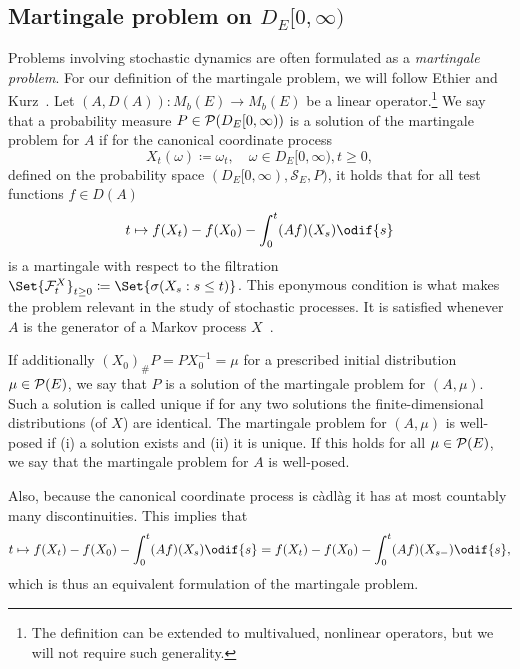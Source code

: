 

\subsection{Martingale problem on \texorpdfstring{\(D_E[0,\infty)\)}{D([0,infinity), E)}}\label{sec:martingale-problem}

Problems involving stochastic dynamics are often formulated as a \textit{martingale problem}.
For our definition of the martingale problem, we will follow Ethier and Kurz~\cite[p.174]{ethierMarkovProcessesCharacterization1985}.
Let \((A, D(A)) : M_b(E) \to M_b(E)\) be a linear operator.\footnote{The definition can be extended to multivalued, nonlinear operators, but we will not require such generality.}
We say that a probability measure \(P \in \mathcal{P}(D_E[0,\infty))\) is a solution of the martingale problem for \(A\) if for the canonical coordinate process
\begin{equation}
  X_t(\omega) \coloneqq \omega_t, \quad \omega \in D_E[0,\infty), t \geq 0,
\end{equation}
defined on the probability space \((D_E[0,\infty), \mathscr{S}_E, P)\), it holds that for all test functions \(f \in D(A)\)
\begin{equation}\label{eq:mart-problem}
  t \mapsto f(X_t) - f(X_0) - \int_0^t (Af)(X_s) \odif{s}
\end{equation}
is a martingale with respect to the filtration \(\Set{\cF_t^X}_{t\geq0} \coloneqq \Set{\sigma(X_s : s \leq t)}\). %
This eponymous condition is what makes the problem relevant in the study of stochastic processes.
It is satisfied whenever \(A\) is the generator of a Markov process \(X\)~\cite[161-162]{ethierMarkovProcessesCharacterization1985}.

If additionally \( (X_0)_\# P = P X_0^{-1} = \mu \) for a prescribed initial distribution \(\mu \in \mathcal{P}(E)\), we say that \(P\) is a solution of the martingale problem for \((A,\mu)\).
Such a solution is called unique if for any two solutions the finite-dimensional distributions (of \(X\)) are identical.
The martingale problem for \((A,\mu)\) is well-posed if (i) a solution exists and (ii) it is unique.
If this holds for all \(\mu \in \mathcal{P}(E)\), we say that the martingale problem for \(A\) is well-posed.

Also, because the canonical coordinate process is càdlàg it has at most countably many discontinuities.
This implies that
\begin{equation}\label{eq:mart-problem-s-}
  t \mapsto f(X_t) - f(X_0) - \int_0^t (Af)(X_s) \odif{s}
  = f(X_t) - f(X_0) - \int_0^t (Af)(X_{s-}) \odif{s},
\end{equation}
which is thus an equivalent formulation of the martingale problem.
